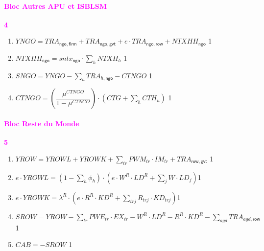 \documentclass[11pt,a4paper]{article}
\newcommand{\agd}{\mathit{agd}}
\newcommand{\firm}{\mathsf{firm}}
\newcommand{\gvt}{\mathsf{gvt}}
\newcommand{\ngo}{\mathsf{ngo}}
\newcommand{\row}{\mathsf{row}}
\newcommand{\sntx}{\mathit{sntx}}
\newcommand{\tr}{\mathit{tr}}
\newcommand{\trj}{\mathit{trj}}
\newcommand{\CAB}{\mathit{CAB}}
\newcommand{\CTG}{\mathit{CTG}}
\newcommand{\CTH}{\mathit{CTH}}
\newcommand{\CTNGO}{\mathit{CTNGO}}
\newcommand{\EX}{\mathit{EX}}
\newcommand{\IM}{\mathit{IM}}
\newcommand{\KD}{\mathit{KD}}
\newcommand{\LD}{\mathit{LD}}
\newcommand{\NTXH}{\mathit{NTXH}}
\newcommand{\NTXHH}{\mathit{NTXHH}}
\newcommand{\PWE}{\mathit{PWE}}
\newcommand{\PWM}{\mathit{PWM}}
\newcommand{\SNGO}{\mathit{SNGO}}
\newcommand{\SROW}{\mathit{SROW}}
\newcommand{\TRA}{\mathit{TRA}}
\newcommand{\YNGO}{\mathit{YNGO}}
\newcommand{\YROW}{\mathit{YROW}}
\newcommand{\YROWK}{\mathit{YROWK}}
\newcommand{\YROWL}{\mathit{YROWL}}
\newcommand{\redparagraph}[1]{\paragraph*{\large\textcolor{Fuchsia}{#1}}}
\begin{document}
	
	\redparagraph{Bloc Autres APU et ISBLSM }\hfill \textcolor{Fuchsia}{\textbf{4}}
	\begin{enumerate}[itemsep=2pt,label=\textbf{eq\arabic*}.,resume,  ref=\textbf{eq\arabic*}]	
			
		\item $\YNGO = \TRA_{\ngo,\firm} + \TRA_{\ngo,\gvt} + e\cdot\TRA_{\ngo,\row} + \NTXHH_{\ngo} $ \hfill 1
		
		\item $\NTXHH_{\ngo} = \sntx_{\ngo} \cdot \sum_{h}\NTXH_h$ \hfill 1
		
		\item $\SNGO = \YNGO - \sum_{h}\TRA_{h,\ngo}  - \CTNGO$ \hfill 1	
		
		\item $\CTNGO = \left(\dfrac{\mu^{\CTNGO}}{1-\mu^{\CTNGO}}\right)\cdot \left(\CTG + \sum_{h}\CTH_h\right)$	\label{it:Gothntr}	\hfill 1	
					
	\end{enumerate}
	
	\redparagraph{Bloc Reste du Monde}\hfill \textcolor{Fuchsia}{\textbf{5}}
	\begin{enumerate}[itemsep=2pt,label=\textbf{eq\arabic*}.,resume,  ref=\textbf{eq\arabic*}]	
			
		\item $\YROW =  \YROWL + \YROWK +\sum_{\tr}^{} \PWM_{\tr}\cdot\IM_{tr} + \TRA_{\row,\gvt}$ \hfill 1
		
		\item $e\cdot\YROWL = \left(1 -\sum_{h}\phi_h\right)\cdot \left(e\cdot  W^R\cdot\LD^R + \sum_{j}^{} W\cdot\LD_{j}\right) $\hfill 1
		
		\item $e\cdot\YROWK = \lambda^R\cdot \left(e\cdot R^R\cdot\KD^R + \sum_{\trj}^{} R_{\trj}\cdot\KD_{\trj}\right) $\hfill 1
		
		\item $\SROW = \YROW - \sum_{\tr}^{} \PWE_{\tr}\cdot\EX_{\tr}  -  W^R\cdot\LD^R  -  R^R\cdot\KD^R  - \sum_{\agd}\TRA_{\agd,\row}$\hfill 1	
		
		\item $\CAB = -\SROW$ \hfill 1		
		
	\end{enumerate}
	
\end{document}
